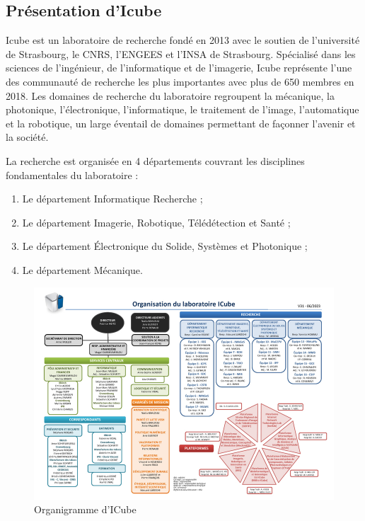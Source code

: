 \subsection{Présentation d'Icube}

Icube est un laboratoire de recherche fondé en 2013 avec le soutien de l'université de Strasbourg, le CNRS, l'ENGEES et l'INSA de Strasbourg. Spécialisé dans les sciences de l'ingénieur, de l'informatique et de l'imagerie, Icube représente l'une des communauté de recherche les plus importantes avec plus de 650 membres en 2018. Les domaines de recherche du laboratoire regroupent la mécanique, la photonique, l'électronique, l'informatique, le traitement de l'image, l'automatique et la robotique, un large éventail de domaines permettant de façonner l'avenir et la société.

La recherche est organisée en 4 départements couvrant les disciplines fondamentales du laboratoire :
\begin{enumerate}
    \item{} Le département Informatique Recherche ;
    \item{} Le département Imagerie, Robotique, Télédétection et Santé ;
    \item{} Le département Électronique du Solide, Systèmes et Photonique ;
    \item{} Le département Mécanique.
\end{enumerate}

\begin{figure}[H]
    \centering
    \includegraphics[scale=0.3]{figures/presentation/organigramme.jpg}
    \caption{Organigramme d'ICube}
    \label{fig1}
\end{figure}

